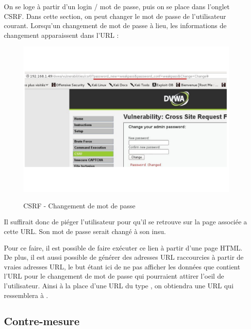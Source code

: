 On se loge à partir d'un login / mot de passe, puis on se place dans l'onglet CSRF. Dans cette section, on peut changer le mot de passe de l'utilisateur courant. Lorsqu'un changement de mot de passe à lieu, les informations de changement apparaissent dans l'URL : 

\begin{figure}[!h]
\begin{center}

\label{inclusion}
\includegraphics[scale=1.2]{images/CSRF-ChangementMotDePasse.pdf}

\caption{CSRF - Changement de mot de passe}

\end{center}
\end{figure}

Il suffirait donc de piéger l'utilisateur pour qu'il se retrouve sur la page associée a cette URL. Son mot de passe serait changé à son insu.

Pour ce faire, il est possible de faire exécuter ce lien à partir d'une page HTML. De plus, il est aussi possible de générer des adresses URL raccourcies à partir de vraies adresses URL, le but étant ici de ne pas afficher les données que contient l'URL pour le changement de mot de passe qui pourraient attirer l'oeil de l'utilisateur. Ainsi à la place d'une URL du type , on obtiendra une URL qui ressemblera à .

\subsection{Contre-mesure}

